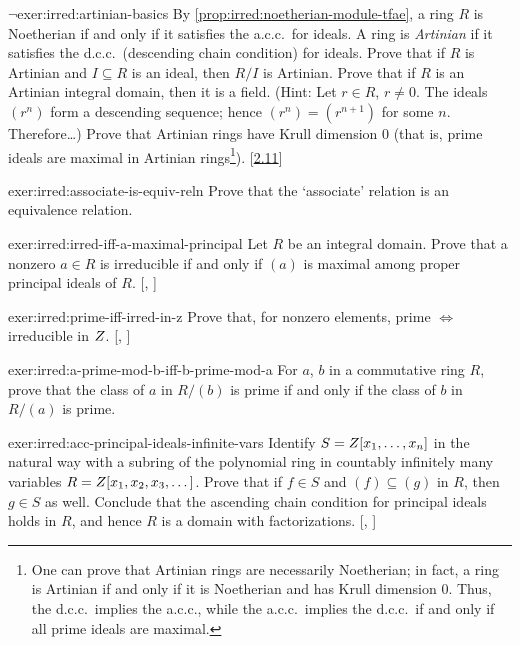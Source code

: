 \begin{exer}{$\lnot$}{exer:irred:artinian-basics}
  By \cref{prop:irred:noetherian-module-tfae}, a ring $R$ is Noetherian if and only if it
  satisfies the a.c.c.\ for ideals. A ring is \emph{Artinian} if it
  satisfies the d.c.c.\ (descending chain condition) for ideals. Prove
  that if $R$ is Artinian and $I \subseteq R$ is an ideal, then $R/I$
  is Artinian.  Prove that if $R$ is an Artinian integral domain, then
  it is a field.  (Hint: Let $r \in R$, $r \neq 0$. The ideals $(r^n)$
  form a descending sequence; hence $(r^n) = (r^{n+1})$ for some
  $n$. Therefore\dots) Prove that Artinian rings have Krull dimension
  $0$ (that is, prime ideals are maximal in Artinian
  rings\footnote{One can prove that Artinian rings are necessarily
    Noetherian; in fact, a ring is Artinian if and only if it is
    Noetherian and has Krull dimension $0$. Thus, the d.c.c.\ implies
    the a.c.c., while the a.c.c.\ implies the d.c.c.\ if and only if
    all prime ideals are
    maximal.}). [\hyperref[exer:irred:pid-mod-ideal-is-artinian]{2.11}]
\end{exer}

\begin{exer}{}{exer:irred:associate-is-equiv-reln}
  Prove that the `associate' relation is an equivalence relation.
\end{exer}

\begin{exer}{\exerused}{exer:irred:irred-iff-a-maximal-principal}
  Let $R$ be an integral domain. Prove that a nonzero $a \in R$ is
  irreducible if and only if $(a)$ is maximal among proper principal
  ideals of
  $R$. [,
  ]
\end{exer}

\begin{exer}{\exerused}{exer:irred:prime-iff-irred-in-z}
  Prove that, for nonzero elements, prime $\iff$ irreducible in $Z$.
  [,
  ]
\end{exer}

\begin{exer}{}{exer:irred:a-prime-mod-b-iff-b-prime-mod-a}
  For $a$, $b$ in a commutative ring $R$, prove that the class of $a$
  in $R/(b)$ is prime if and only if the class of $b$ in $R/(a)$ is
  prime.
\end{exer}

\begin{exer}{\exerused}{exer:irred:acc-principal-ideals-infinite-vars}
  Identify $S = Z[x_1, \dots, x_n]$ in the natural way with a subring
  of the polynomial ring in countably infinitely many variables
  $R = Z[x_1, x_2, x_3, \dots]$. Prove that if $f \in S$ and
  $(f) \subseteq (g)$ in $R$, then $g \in S$ as well. Conclude that
  the ascending chain condition for principal ideals holds in $R$, and
  hence $R$ is a domain with
  factorizations. [,
  ]
\end{exer}

